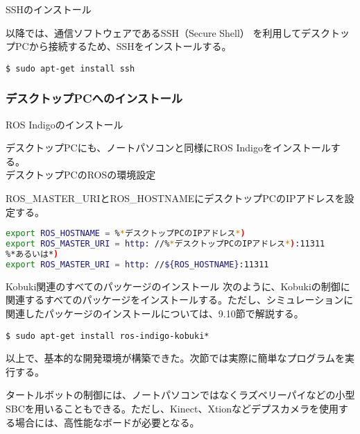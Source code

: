\begin{itemize}
\circled{\thenum} SSHのインストール

以降では、通信ソフトウェアであるSSH（Secure Shell）  を利用してデスクトップPCから接続するため、SSHをインストールする。\\

\begin{lstlisting}[language=ROS]
$ sudo apt-get install ssh
\end{lstlisting}


\subsubsection{デスクトップPCへのインストール}

\setcounter{num}{0}

\circled{\thenum} ROS Indigoのインストール

デスクトップPCにも、ノートパソコンと同様にROS Indigoをインストールする。\\

\circled{\thenum} デスクトップPCのROSの環境設定

ROS\_MASTER\_URIとROS\_HOSTNAMEにデスクトップPCのIPアドレスを設定する。\\

\begin{lstlisting}[language=bash]
export ROS_HOSTNAME = %*デスクトップPCのIPアドレス*)
export ROS_MASTER_URI = http: //%*デスクトップPCのIPアドレス*):11311
%*あるいは*)
export ROS_MASTER_URI = http: //${ROS_HOSTNAME}:11311
\end{lstlisting}

\circled{\thenum} Kobuki関連のすべてのパッケージのインストール
次のように、Kobukiの制御に関連するすべてのパッケージをインストールする。ただし、シミュレーションに関連したパッケージのインストールについては、9.10節で解説する。\\

\begin{lstlisting}[language=ROS]
$ sudo apt-get install ros-indigo-kobuki*
\end{lstlisting}

以上で、基本的な開発環境が構築できた。次節では実際に簡単なプログラムを実行する。\\

\begin{exercise}
タートルボットの制御には、ノートパソコンではなくラズベリーパイなどの小型SBCを用いることもできる。ただし、Kinect、Xtionなどデプスカメラを使用する場合には、高性能なボードが必要となる。
\end{exercise}


\end{itemize}
